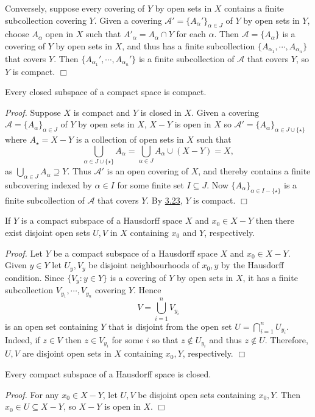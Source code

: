 Conversely, suppose every covering of $Y$ by open sets in $X$ contains a finite subcollection covering $Y$. Given a covering $\mathcal{A}' = \{A_\alpha'\}_{\alpha \in J}$ of $Y$ by open sets in $Y$, choose $A_\alpha$ open in $X$ such that $A'_\alpha = A_\alpha \cap Y$ for each $\alpha$. Then $\mathcal{A} = \{A_\alpha\}$ is a covering of $Y$ by open sets in $X$, and thus has a finite subcollection $\{A_{\alpha_1}, \cdots, A_{\alpha_n}\}$ that covers $Y$. Then $\{A_{\alpha_1}', \cdots, A_{\alpha_n}'\}$ is a finite subcollection of $\mathcal{A}$ that covers $Y$, so $Y$ is compact. $\Box$

\begin{theorem}\label{3.24}
    Every closed subspace of a compact space is compact.
\end{theorem}
{\it Proof.} Suppose $X$ is compact and $Y$ is closed in $X$. Given a covering $\mathcal{A} = \{A_\alpha\}_{\alpha \in J}$ of $Y$ by open sets in $X$, $X-Y$ is open in $X$ so $\mathcal{A}' = \{A_\alpha\}_{\alpha \in J \cup \{\star\}}$ where $A_\star = X-Y$ is a collection of open sets in $X$ such that
$$\bigcup_{\alpha \in J \cup \{\star\}} A_\alpha = \bigcup_{\alpha \in J} A_\alpha \cup (X-Y) = X,$$
as $\bigcup_{\alpha \in J} A_\alpha \supseteq Y$. Thus $\mathcal{A}'$ is an open covering of $X$, and thereby contains a finite subcovering indexed by $\alpha \in I$ for some finite set $I \subseteq J$. Now $\{A_\alpha\}_{\alpha \in I - \{\star\}}$ is a finite subcollection of $\mathcal{A}$ that covers $Y$. By \hyperref[3.23]{3.23}, $Y$ is compact. $\Box$

\begin{lemma}\label{3.25}
    If $Y$ is a compact subspace of a Hausdorff space $X$ and $x_0 \in X-Y$ then there exist disjoint open sets $U, V$ in $X$ containing $x_0$ and $Y$, respectively.
\end{lemma}
{\it Proof.} Let $Y$ be a compact subspace of a Hausdorff space $X$ and $x_0 \in X - Y$. Given $y \in Y$ let $U_y, V_y$ be disjoint neighbourhoods of $x_0, y$ by the Hausdorff condition. Since $\{V_y: y \in Y\}$ is a covering of $Y$ by open sets in $X$, it has a finite subcollection $V_{y_1}, \cdots, V_{y_n}$ covering $Y$. Hence
$$V = \bigcup_{i=1}^n V_{y_i}$$
is an open set containing $Y$ that is disjoint from the open set $U = \bigcap_{i=1}^n U_{y_i}$. Indeed, if $z \in V$ then $z \in V_{y_i}$ for some $i$ so that $z \notin U_{y_i}$ and thus $z\notin U$. Therefore, $U, V$ are disjoint open sets in $X$ containing $x_0, Y$, respectively. $\Box$

\begin{theorem}\label{3.26}
    Every compact subspace of a Hausdorff space is closed.
\end{theorem}
{\it Proof.} For any $x_0 \in X-Y$, let $U, V$ be disjoint open sets containing $x_0, Y$. Then $x_0 \in U \subseteq X-Y$, so $X-Y$ is open in $X.$ $\Box$

